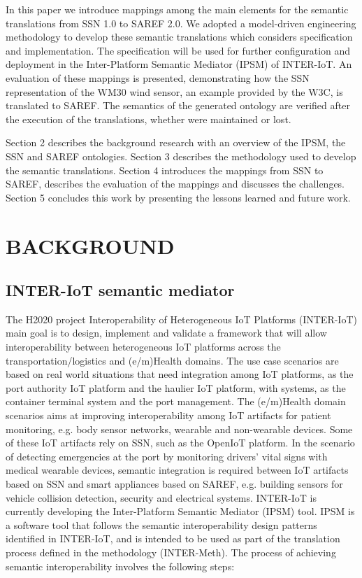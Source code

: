 \documentclass{sig-alternate-05-2015}
\begin{document}
In this paper we introduce mappings among the main elements for the semantic translations from SSN 1.0 to SAREF 2.0. We adopted a model-driven engineering methodology to develop these semantic translations which considers specification and implementation. The specification will be used for further configuration and deployment in the Inter-Platform Semantic Mediator (IPSM) of INTER-IoT. An evaluation of these mappings is presented, demonstrating how the SSN representation of the WM30 wind sensor, an example provided by the W3C, is translated to SAREF. The semantics of the generated ontology are verified after the execution of the translations, whether were maintained or lost. 

Section 2 describes the background research with an overview of the IPSM, the SSN and SAREF ontologies. Section 3 describes the methodology used to develop the semantic translations. Section 4 introduces the mappings from SSN to SAREF, describes the evaluation of the mappings and discusses the challenges. Section 5 concludes this work by presenting the lessons learned and future work. 


\section{BACKGROUND}

\subsection{INTER-IoT semantic mediator}
The H2020 project Interoperability of Heterogeneous IoT Platforms (INTER-IoT) \cite{Ganzha2017a,Ganzha2016} main goal is to design, implement and validate a framework that will allow interoperability between heterogeneous IoT platforms across the transportation/logistics and (e/m)Health domains. The use case scenarios are based on real world situations that need integration among IoT platforms, as the port authority IoT platform and the haulier IoT platform, with systems, as the container terminal system and the port management. The (e/m)Health domain scenarios aims at improving interoperability among IoT artifacts for patient monitoring, e.g. body sensor networks, wearable and non-wearable devices. Some of these IoT artifacts rely on SSN, such as the OpenIoT platform. In the scenario of detecting emergencies at the port by monitoring drivers' vital signs with medical wearable devices, semantic integration is required between IoT artifacts based on SSN and smart appliances based on SAREF, e.g. building sensors for vehicle collision detection, security and electrical systems. INTER-IoT is currently developing the  Inter-Platform Semantic Mediator (IPSM) tool. IPSM is a software tool that follows the semantic interoperability design patterns identified in INTER-IoT, and is intended to be used as part of the translation process defined in the methodology (INTER-Meth). The process of achieving semantic interoperability involves the following steps:
\end{document}
